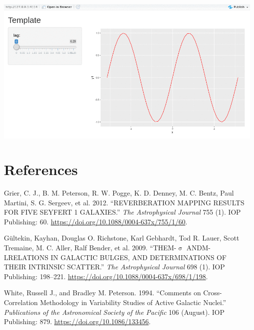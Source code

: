 \documentclass[]{article}
\begin{document}
\includegraphics{./templategif_screenshots/template.gif}

\hypertarget{references}{%
\section*{References}\label{references}}

\hypertarget{refs}{}
\leavevmode\hypertarget{ref-Grier_2012}{}%
Grier, C. J., B. M. Peterson, R. W. Pogge, K. D. Denney, M. C. Bentz,
Paul Martini, S. G. Sergeev, et al. 2012. ``REVERBERATION MAPPING
RESULTS FOR FIVE SEYFERT 1 GALAXIES.'' \emph{The Astrophysical Journal}
755 (1). IOP Publishing: 60.
\url{https://doi.org/10.1088/0004-637x/755/1/60}.

\leavevmode\hypertarget{ref-Gultekin_2009}{}%
Gültekin, Kayhan, Douglas O. Richstone, Karl Gebhardt, Tod R. Lauer,
Scott Tremaine, M. C. Aller, Ralf Bender, et al. 2009.
``THEM-\(\upsigma\) ANDM-LRELATIONS IN GALACTIC BULGES, AND
DETERMINATIONS OF THEIR INTRINSIC SCATTER.'' \emph{The Astrophysical
Journal} 698 (1). IOP Publishing: 198--221.
\url{https://doi.org/10.1088/0004-637x/698/1/198}.

\leavevmode\hypertarget{ref-White_1994}{}%
White, Russell J., and Bradley M. Peterson. 1994. ``Comments on
Cross-Correlation Methodology in Variability Studies of Active Galactic
Nuclei.'' \emph{Publications of the Astronomical Society of the Pacific}
106 (August). IOP Publishing: 879. \url{https://doi.org/10.1086/133456}.
\end{document}
